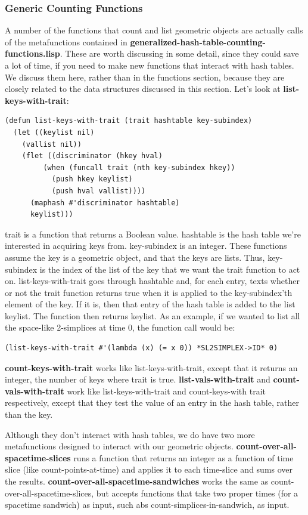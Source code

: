 \documentclass[12pt]{article}
\begin{document}
\subsubsection{Generic Counting Functions}

A number of the functions that count and list geometric objects are
actually calls of the metafunctions contained in
\textbf{generalized-hash-table-counting-functions.lisp}. These are
worth discussing in some detail, since they could save a lot of time,
if you need to make new functions that interact with hash tables. We
discuss them here, rather than in the functions section, because they
are closely related to the data structures discussed in this
section. Let's look at \textbf{list-keys-with-trait}:
\begin{lstlisting}
(defun list-keys-with-trait (trait hashtable key-subindex)
  (let ((keylist nil)
	(vallist nil))
    (flet ((discriminator (hkey hval)
	     (when (funcall trait (nth key-subindex hkey))
	       (push hkey keylist)
	       (push hval vallist))))
      (maphash #'discriminator hashtable)
      keylist)))
\end{lstlisting}
trait is a function that returns a Boolean value. hashtable is the
hash table we're interested in acquiring keys from. key-subindex is an
integer. These functions assume the key is a geometric object, and
that the keys are lists. Thus, key-subindex is the index of the list
of the key that we want the trait function to act
on. list-keys-with-trait goes through hashtable and, for each entry,
texts whether or not the trait function returns true when it is
applied to the key-subindex'th element of the key. If it is, then that
entry of the hash table is added to the list keylist. The function
then returns keylist. As an example, if we wanted to list all the
space-like 2-simplices at time 0, the function call would be:
\begin{lstlisting}
(list-keys-with-trait #'(lambda (x) (= x 0)) *SL2SIMPLEX->ID* 0)
\end{lstlisting}

\textbf{count-keys-with-trait} works like list-keys-with-trait, except
that it returns an integer, the number of keys where trait is
true. \textbf{list-vals-with-trait} and \textbf{count-vals-with-trait}
work like list-keys-with-trait and count-keys-with trait respectively,
except that they test the value of an entry in the hash table, rather
than the key.

Although they don't interact with hash tables, we do have two more
metafunctions designed to interact with our geometric
objects. \textbf{count-over-all-spacetime-slices} runs a function that
returns an integer as a function of time slice (like
count-points-at-time) and applies it to each time-slice and sums over
the results. \textbf{count-over-all-spacetime-sandwiches} works the
same as count-over-all-spacetime-slices, but accepts functions that
take two proper times (for a spacetime sandwich) as input, such abs
count-simplices-in-sandwich, as input.
\end{document}
